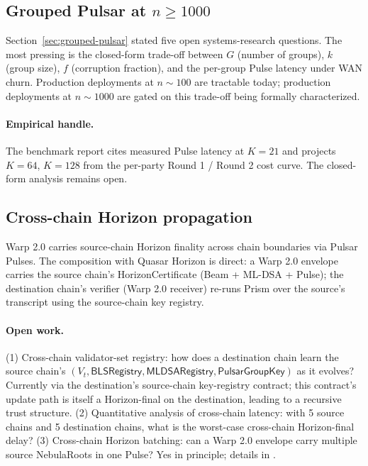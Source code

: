 \subsection{Grouped Pulsar at $n \geq 1000$}

Section~\ref{sec:grouped-pulsar} stated five open systems-research questions. The most pressing is the closed-form trade-off between $G$ (number of groups), $k$ (group size), $f$ (corruption fraction), and the per-group Pulse latency under WAN churn. Production deployments at $n \sim 100$ are tractable today; production deployments at $n \sim 1000$ are gated on this trade-off being formally characterized.

\paragraph{Empirical handle.} The benchmark report \cite{luxbenchmarks} cites measured Pulse latency at $K = 21$ and projects $K = 64$, $K = 128$ from the per-party Round 1 / Round 2 cost curve. The closed-form analysis remains open.

\subsection{Cross-chain Horizon propagation}

Warp 2.0 \cite{luxwarpv2,lp021v2} carries source-chain Horizon finality across chain boundaries via Pulsar Pulses. The composition with Quasar Horizon is direct: a Warp 2.0 envelope carries the source chain's HorizonCertificate (Beam + ML-DSA + Pulse); the destination chain's verifier (Warp 2.0 receiver) re-runs Prism over the source's transcript using the source-chain key registry.

\paragraph{Open work.} (1) Cross-chain validator-set registry: how does a destination chain learn the source chain's $(V_t, \mathsf{BLSRegistry}, \mathsf{MLDSARegistry}, \mathsf{PulsarGroupKey})$ as it evolves? Currently via the destination's source-chain key-registry contract; this contract's update path is itself a Horizon-final on the destination, leading to a recursive trust structure. (2) Quantitative analysis of cross-chain latency: with 5 source chains and 5 destination chains, what is the worst-case cross-chain Horizon-final delay? (3) Cross-chain Horizon batching: can a Warp 2.0 envelope carry multiple source NebulaRoots in one Pulse? Yes in principle; details in \cite{luxwarpv2}.

